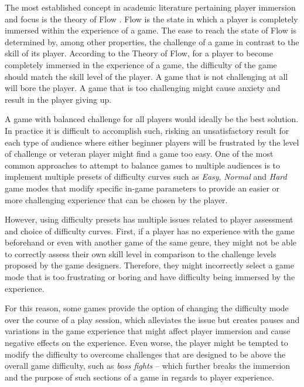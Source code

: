 The most established concept in academic literature pertaining player immersion and focus is the theory of Flow \cite{BOOK_Flow}. Flow is the state in which a player is completely immersed within the experience of a game. The ease to reach the state of Flow is determined by, among other properties, the challenge of a game in contrast to the skill of its player. According to the Theory of Flow, for a player to become completely immersed in the experience of a game, the difficulty of the game should match the skill level of the player. A game that is not challenging at all will bore the player. A game that is too challenging might cause anxiety and result in the player giving up.

A game with balanced challenge for all players would ideally be the best solution. In practice it is difficult to accomplish such, risking an unsatisfactory result for each type of audience where either beginner players will be frustrated by the level of challenge or veteran player might find a game too easy. One of the most common approaches to attempt to balance games to multiple audiences is to implement multiple presets of difficulty curves such as \emph{Easy}, \emph{Normal} and \emph{Hard} game modes that modify specific in-game parameters to provide an easier or more challenging experience that can be chosen by the player.

However, using difficulty presets has multiple issues related to player assessment and choice of difficulty curves. First, if a player has no experience with the game beforehand or even with another game of the same genre, they might not be able to correctly assess their own skill level in comparison to the challenge levels proposed by the game designers. Therefore, they might incorrectly select a game mode that is too frustrating or boring and have difficulty being immersed by the experience.

For this reason, some games provide the option of changing the difficulty mode over the course of a play session, which alleviates the issue but creates pauses and variations in the game experience that might affect player immersion and cause negative effects on the experience. Even worse, the player might be tempted to modify the difficulty to overcome challenges that are designed to be above the overall game difficulty, such as \emph{boss fights} -- which further breaks the immersion and the purpose of such sections of a game in regards to player experience.

